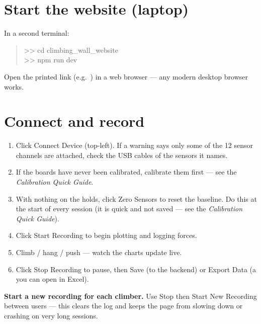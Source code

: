 \documentclass[11pt,a4paper]{article}
\begin{document}
\section{Start the website (laptop)}
In a second terminal:
\begin{quote}\ttfamily\small
>> cd climbing\_wall\_website\\
>> npm run dev
\end{quote}
Open the printed link (e.g.\ ) in a web browser ---
any modern desktop browser works.

\section{Connect and record}
\begin{enumerate}
  \item Click \textsf{Connect Device} (top-left). If a warning says only some of
        the 12 sensor channels are attached, check the USB cables of the sensors
        it names.
  \item If the boards have never been calibrated, calibrate them first --- see the
        \emph{Calibration Quick Guide}.
  \item With nothing on the holds, click \textsf{Zero Sensors} to reset the baseline.
        Do this at the start of every session (it is quick and not saved --- see the
        \emph{Calibration Quick Guide}).
  \item Click \textsf{Start Recording} to begin plotting and logging forces.
  \item Climb / hang / push --- watch the charts update live.
  \item Click \textsf{Stop Recording} to pause, then \textsf{Save} (to the backend)
        or \textsf{Export Data} (a  you can open in Excel).
\end{enumerate}

\begin{warnbox}
\textbf{Start a new recording for each climber.} Use \textsf{Stop} then
\textsf{Start New Recording} between users --- this clears the log and keeps the
page from slowing down or crashing on very long sessions.
\end{warnbox}

\end{document}
